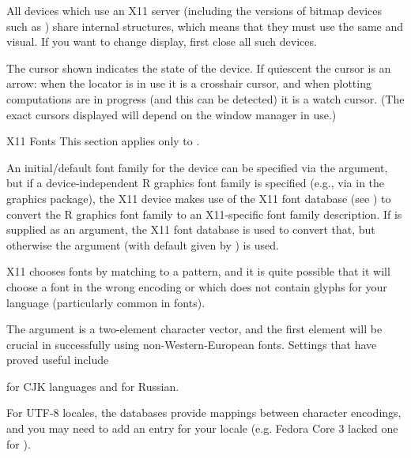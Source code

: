 \begin{Details}
All devices which use an X11 server (including the  versions of bitmap devices such as ) share
internal structures, which means that they must use the same
 and visual.  If you want to change display, first close
all such devices.

The cursor shown indicates the state of the device.  If quiescent the
cursor is an arrow: when the locator is in use it is a crosshair
cursor, and when plotting computations are in progress (and this can
be detected) it is a watch cursor.  (The exact cursors displayed will
depend on the window manager in use.)
\end{Details}
%
\begin{Section}{X11 Fonts}
This section applies only to .

An initial/default font family for the device can be specified via
the  argument, but if a device-independent R graphics font
family is specified (e.g., via  in the graphics
package), the X11 device makes use of the X11 font database (see
) to convert the R graphics font family to an
X11-specific font family description.  If  is supplied as
an argument, the X11 font database is used to convert that, but
otherwise the argument  (with default given by
) is used.

X11 chooses fonts by matching to a pattern, and it is quite possible
that it will choose a font in the wrong encoding or which does not
contain glyphs for your language (particularly common in
 fonts).

The  argument is a two-element character vector, and the
first element will be crucial in successfully using
non-Western-European fonts.  Settings that have proved useful include

 for CJK languages and
 for Russian.

For UTF-8 locales, the  databases provide mappings
between character encodings, and you may need to add an entry for your
locale (e.g. Fedora Core 3 lacked one for ).
\end{Section}
%
